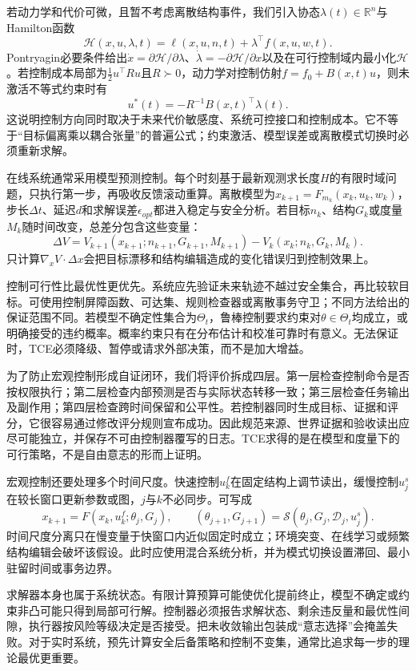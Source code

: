 若动力学和代价可微，且暂不考虑离散结构事件，我们引入协态$\lambda(t)\in\mathbb{R}^{n}$与Hamilton函数
\[
\mathcal{H}(x,u,\lambda,t)=\ell(x,u,n,t)+\lambda^{\top}f(x,u,w,t).
\]
Pontryagin必要条件给出$\dot x=\partial\mathcal{H}/\partial\lambda$、$\dot\lambda=-\partial\mathcal{H}/\partial x$以及在可行控制域内最小化$\mathcal{H}$。若控制成本局部为$\frac12u^{\top}Ru$且$R\succ0$，动力学对控制仿射$f=f_0+B(x,t)u$，则未激活不等式约束时有
\[
u^*(t)=-R^{-1}B(x,t)^{\top}\lambda(t).
\]
这说明控制方向同时取决于未来代价敏感度、系统可控接口和控制成本。它不等于“目标偏离乘以耦合张量”的普遍公式；约束激活、模型误差或离散模式切换时必须重新求解。

在线系统通常采用模型预测控制。每个时刻基于最新观测求长度$H$的有限时域问题，只执行第一步，再吸收反馈滚动重算。离散模型为$x_{k+1}=F_{m_k}(x_k,u_k,w_k)$，步长$\Delta t$、延迟$d$和求解误差$\epsilon_{opt}$都进入稳定与安全分析。若目标$n_k$、结构$G_k$或度量$M_k$随时间改变，总差分包含这些变量：
\[
\Delta V=V_{k+1}(x_{k+1};n_{k+1},G_{k+1},M_{k+1})
-V_k(x_k;n_k,G_k,M_k).
\]
只计算$\nabla_xV\cdot\Delta x$会把目标漂移和结构编辑造成的变化错误归到控制效果上。

控制可行性比最优性更优先。系统应先验证未来轨迹不越过安全集合，再比较软目标。可使用控制屏障函数、可达集、规则检查器或离散事务守卫；不同方法给出的保证范围不同。若模型不确定性集合为$\Theta_t$，鲁棒控制要求约束对$\theta\in\Theta_t$均成立，或明确接受的违约概率。概率约束只有在分布估计和校准可靠时有意义。无法保证时，TCE必须降级、暂停或请求外部决策，而不是加大增益。

为了防止宏观控制形成自证闭环，我们将评价拆成四层。第一层检查控制命令是否按权限执行；第二层检查内部预测是否与实际状态转移一致；第三层检查任务输出及副作用；第四层检查跨时间保留和公平性。若控制器同时生成目标、证据和评分，它很容易通过修改评分规则宣布成功。因此规范来源、世界证据和验收读出应尽可能独立，并保存不可由控制器覆写的日志。TCE求得的是在模型和度量下的可行策略，不是自由意志的形而上证明。

宏观控制还要处理多个时间尺度。快速控制$u^f_k$在固定结构上调节读出，缓慢控制$u^s_j$在较长窗口更新参数或图，$j$与$k$不必同步。可写成
\[
x_{k+1}=F(x_k,u^f_k;\theta_j,G_j),\qquad
(\theta_{j+1},G_{j+1})=\mathcal{S}(\theta_j,G_j,\mathcal{D}_{j},u^s_j).
\]
时间尺度分离只在慢变量于快窗口内近似固定时成立；环境突变、在线学习或频繁结构编辑会破坏该假设。此时应使用混合系统分析，并为模式切换设置滞回、最小驻留时间或事务边界。

求解器本身也属于系统状态。有限计算预算可能使优化提前终止，模型不确定或约束非凸可能只得到局部可行解。控制器必须报告求解状态、剩余违反量和最优性间隙，执行器按风险等级决定是否接受。把未收敛输出包装成“意志选择”会掩盖失败。对于实时系统，预先计算安全后备策略和控制不变集，通常比追求每一步的理论最优更重要。

